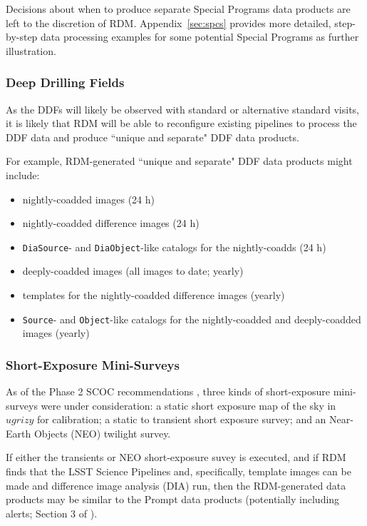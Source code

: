 Decisions about when to produce separate Special Programs data products are 
left to the discretion of RDM.
Appendix~\ref{sec:spcs} provides more detailed, step-by-step data processing 
examples for some potential Special Programs as further illustration. 


\subsubsection{Deep Drilling Fields}

As the DDFs will likely be observed with standard or alternative standard 
visits, it is likely that RDM will be able to reconfigure existing pipelines 
to process the DDF data and produce ``unique and separate" DDF data products.

For example, RDM-generated ``unique and separate" DDF data products might 
include:
\begin{itemize}
\item nightly-coadded images (24 h)
\item nightly-coadded difference images (24 h)
\item {\tt DiaSource}- and {\tt DiaObject}-like catalogs for the nightly-coadds (24 h)
\item deeply-coadded images (all images to date; yearly)
\item templates for the nightly-coadded difference images (yearly)
\item {\tt Source}- and {\tt Object}-like catalogs for the nightly-coadded and deeply-coadded images (yearly)
\end{itemize}


\subsubsection{Short-Exposure Mini-Surveys}

As of the Phase 2 SCOC recommendations , three kinds of 
short-exposure mini-surveys were under consideration: 
a static short exposure map of the sky in $ugrizy$ for calibration; 
a static to transient short exposure survey; and 
an Near-Earth Objects (NEO) twilight survey.

If either the transients or NEO short-exposure suvey is executed, and if 
RDM finds that the LSST Science Pipelines and, specifically, template images 
can be made and difference image analysis (DIA) run, then the RDM-generated 
data products may be similar to the Prompt data products (potentially 
including alerts; Section 3 of ).


